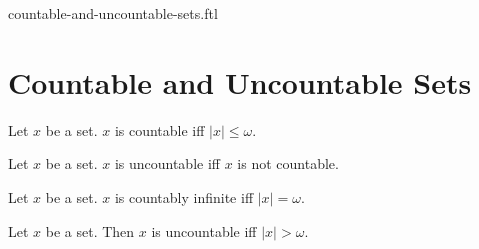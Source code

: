 \documentclass{naproche-library}
\begin{document}
\begin{smodule}{countable-and-uncountable-sets.ftl}

  \section*{Countable and Uncountable Sets}

  \begin{definition}[forthel,id=SET_THEORY_07_8808604616359936,printid]
    Let $x$ be a set.
    $x$ is countable iff $|x| \leq \omega$.
  \end{definition}

  \begin{definition}[forthel,id=SET_THEORY_07_2935263915409408,printid]
    Let $x$ be a set.
    $x$ is uncountable iff $x$ is not countable.
  \end{definition}

  \begin{definition}[forthel,id=SET_THEORY_07_5679866426949632,printid]
    Let $x$ be a set.
    $x$ is countably infinite iff $|x| = \omega$.
  \end{definition}

  \begin{proposition}[forthel,id=SET_THEORY_07_4281623468048384,printid]
    Let $x$ be a set.
    Then $x$ is uncountable iff $|x| > \omega$.
  \end{proposition}
\end{smodule}
\end{document}
